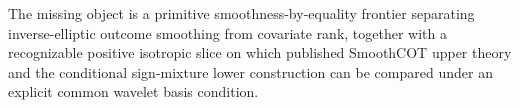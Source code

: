 The missing object is a primitive smoothness-by-equality frontier separating inverse-elliptic outcome smoothing from covariate rank, together with a recognizable positive isotropic slice on which published SmoothCOT upper theory and the conditional sign-mixture lower construction can be compared under an explicit common wavelet basis condition.